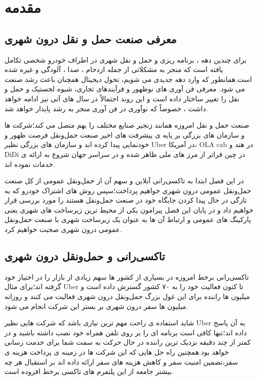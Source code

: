 \chapter{مقدمه}

\section{معرفی صنعت حمل و نقل درون شهری}
برای چندین دهه ، برنامه ریزی و حمل و نقل شهری در اطراف خودرو شخصی تکامل یافته است که منجر به مشکلاتی از جمله ازدحام ، صدا ، آلودگی و غیره شده است.همانطور که وارد دهه جدیدی می شویم، تحول دیجیتال همچنان باعث رشد صنعت می شود. معرفی فن آوری های نوظهور و فرآیندهای تجاری، شیوه لجستیک و حمل و نقل را تغییر ساختار داده است و این روند احتمالاً در سال های آتی نیز ادامه خواهد داشت ، خصوصاً که نوآوری در فن آوری منجر به رشد پایدار خواهد شد.

صنعت حمل و نقل امروزه همانند زنجیر صنایع مختلف را بهم متصل می کند؛‌شرکت ها و سازمان های بزرگی بر پایه ی پیشرفت های اخیر صنعت حمل‌و‌نقل فرصت ظهور و خودنمایی پیدا کرده اند و سازمان های بزرگی نظیر Uber در آمریکا، OLA cab در هند و DiDi در چین فراتر از مرز های ملی ظاهر شده و در سراسر جهان شروع به ارائه ی خدمات نموده اند.

در این فصل ابتدا به تاکسی‌رانی آنلاین و سهم آن از حمل‌و‌نقل عمومی از کل صنعت حمل‌و‌نقل عمومی درون شهری خواهیم پرداخت؛سپس روش های اشتراک خودرو که به تازگی در حال پیدا کردن جایگاه خود در صنعت حمل‌و‌نقل هستند را مورد بررسی قرار خواهیم داد و در پایان این فصل پیرامون یکی از محیط ترین زیرساخت های شهری یعنی پارکینگ های عمومی و ارتباط آن ها به عنوان یک زیرساخت شهری با صنعت حمل‌و‌نقل عمومی درون شهری صحبت خواهیم کرد.
\section{تاکسی‌رانی و حمل‌و‌نقل درون شهری}
تاکسی‌رانی برخط  امروزه در بسیاری از کشور ها سهم زیادی از بازار را در اختیار خود گرفته اند؛برای مثال Uber تا کنون فعالیت خود را به ۷۰ کشور گسترش داده است و میلیون ها راننده برای این غول بزرگ حمل‌و‌نقل درون شهری فعالیت می کنند و روزانه میلیون ها سفر درون شهری بر بستر این شرکت انجام می شود.

شاید استفاده ی راحت مهم ترین نیازی باشد که شرکت هایی نظیر Uber به آن پاسخ داده اند؛تنها کافی است برنامه ای را بر روی تلفن همراه خود نصب داشته باشید و در کمتر از چند دقیقه نزدیک ترین راننده در حال حرکت به سمت شما برای خدمت رسانی خواهد بود.همچنین راه حل هایی که این شرکت ها در زمینه ی پرداخت هزینه ی سفر،‌تضمین امنیت سفر و کاهش هزینه های سفر ارائه داده اند بر استقبال هر چه بیشتر جامعه از این پلتفرم  های تاکسی برخط افزوده است.

